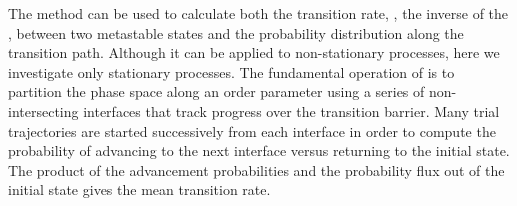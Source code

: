 The  method can be used to calculate both the transition rate, \ie, the inverse of the , between two metastable states and the probability distribution along the transition path\supercite{Valeriani:2007hv}. Although it can be applied to non-stationary processes\supercite{Becker:2012fl}, here we investigate only stationary processes. The fundamental operation of  is to partition the phase space along an order parameter using a series of non-intersecting interfaces that track progress over the transition barrier. Many trial trajectories are started successively from each interface in order to compute the probability of advancing to the next interface versus returning to the initial state. The product of the advancement probabilities and the probability flux out of the initial state gives the mean transition rate.



